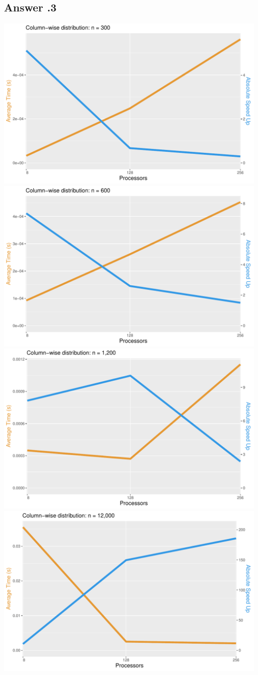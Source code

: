 \documentclass[a4paper,%
11pt,%
DIV=12,
headsepline,%
headings=normal,
]{scrartcl}
\newcounter{curex}
\newcommand{\answer}[1]{\subsection*{Answer \arabic{curex}.#1}}
\begin{document}
\answer{3}
\includegraphics[scale=0.4,page=1]{../plots/matrix_vector_plot_Column-wise-distribution_300} 
\includegraphics[scale=0.4,page=1]{../plots/matrix_vector_plot_Column-wise-distribution_600} \\
\includegraphics[scale=0.4,page=1]{../plots/matrix_vector_plot_Column-wise-distribution_1200} 
\includegraphics[scale=0.4,page=1]{../plots/matrix_vector_plot_Column-wise-distribution_12000} \\
\end{document}
